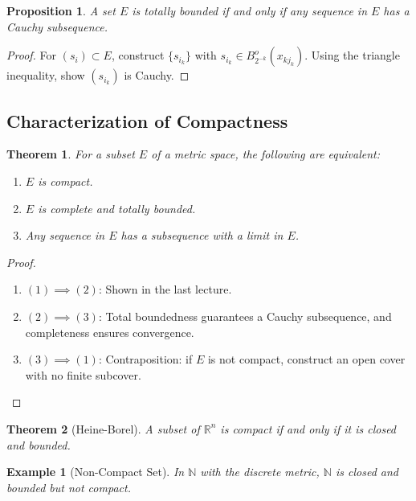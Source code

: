\documentclass[9pt]{article}
\theoremstyle{definition}
\theoremstyle{plain}
\newtheorem{theorem}{Theorem}
\newtheorem{proposition}{Proposition}
\newtheorem{example}{Example}
\begin{document}
\begin{proposition}
A set $ E $ is totally bounded if and only if any sequence in $ E $ has a Cauchy subsequence.
\end{proposition}

\begin{proof}
For $ (s_i) \subset E $, construct $ \{s_{i_k}\} $ with $ s_{i_k} \in B_{2^{-k}}^o(x_{kj_k}) $. Using the triangle inequality, show $ (s_{i_k}) $ is Cauchy.
\end{proof}

\subsection*{Characterization of Compactness}
\begin{theorem}
For a subset $ E $ of a metric space, the following are equivalent:
\begin{enumerate}
    \item $ E $ is compact.
    \item $ E $ is complete and totally bounded.
    \item Any sequence in $ E $ has a subsequence with a limit in $ E $.
\end{enumerate}
\end{theorem}

\begin{proof}

\begin{enumerate}
    \item $ (1) \implies (2) $: Shown in the last lecture.
    \item $ (2) \implies (3) $: Total boundedness guarantees a Cauchy subsequence, and completeness ensures convergence.
    \item $ (3) \implies (1) $: Contraposition: if $ E $ is not compact, construct an open cover with no finite subcover.
\end{enumerate}
\end{proof}

\begin{theorem}[Heine-Borel]
A subset of $ \mathbb{R}^n $ is compact if and only if it is closed and bounded.
\end{theorem}

\begin{example}[Non-Compact Set]
In $ \mathbb{N} $ with the discrete metric, $ \mathbb{N} $ is closed and bounded but not compact.
\end{example}
\end{document}
